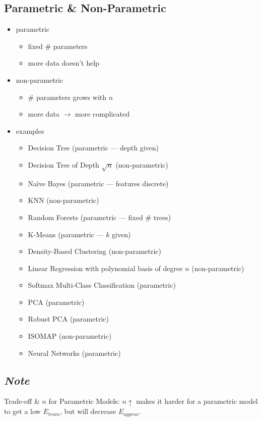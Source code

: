 \documentclass[10pt,landscape,a4paper]{article}
\begin{document}
\begin{multicols*}{5}
\section{Parametric \& Non-Parametric}
\begin{itemize}
    \item parametric
    \begin{itemize}
        \item fixed \# parameters
        \item more data doesn't help
    \end{itemize}
    \item non-parametric
    \begin{itemize}
        \item \# parameters grows with \(n\)
        \item more data \(\rightarrow \)  more complicated
    \end{itemize}
    \item examples
    \begin{itemize}
        \item Decision Tree (parametric --- depth given)
        \item Decision Tree of Depth \(\sqrt{n}\) (non-parametric)
        \item Naïve Bayes (parametric --- features discrete)
        \item KNN (non-parametric)
        \item Random Forests (parametric --- fixed \# trees)
        \item K-Means (parametric --- \(k\) given)
        \item Density-Based Clustering (non-parametric)
        \item Linear Regression with polynomial basis of degree \(n\) (non-parametric)
        \item Softmax Multi-Class Classification (parametric)
        \item PCA (parametric)
        \item Robust PCA (parametric)
        \item ISOMAP (non-parametric)
        \item Neural Networks (parametric)
    \end{itemize}
\end{itemize}

\subsection{\emph{Note}}
Trade-off \& \(n\) for Parametric Models: \(n \uparrow \) makes it harder for a parametric model to get a low \(E_{train}\), but will decrease \(E_{approx}\).


\end{multicols*}
\end{document}
